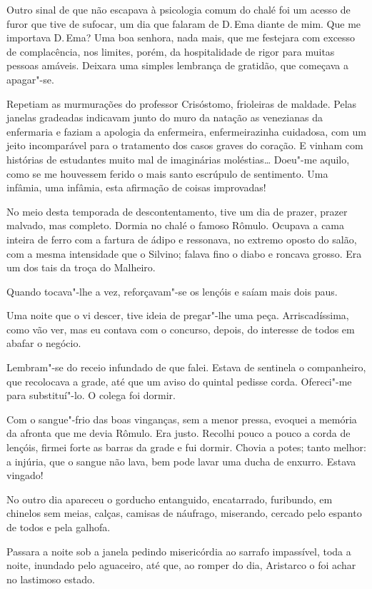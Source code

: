 Outro sinal de que
não escapava à psicologia comum do chalé foi um acesso de furor que
tive de sufocar, um dia que falaram de D.\,Ema diante de mim. Que me
importava D.\,Ema? Uma boa senhora, nada mais, que me festejara com
excesso de complacência, nos limites, porém, da hospitalidade de rigor
para muitas pessoas amáveis. Deixara uma simples lembrança de gratidão,
que começava a apagar"-se. 

Repetiam as murmurações do professor
Crisóstomo, frioleiras de maldade. Pelas janelas gradeadas indicavam
junto do muro da natação as venezianas da enfermaria e faziam a
apologia da enfermeira, enfermeirazinha cuidadosa, com um jeito
incomparável para o tratamento dos casos graves do coração. E vinham
com histórias de estudantes muito mal de imaginárias moléstias\ldots{}
Doeu"-me aquilo, como se me houvessem ferido o mais santo escrúpulo de
sentimento. Uma infâmia, uma
infâmia, esta afirmação de coisas improvadas! 

No meio desta temporada de
descontentamento, tive um dia de prazer, prazer malvado, mas completo.
Dormia no chalé o famoso Rômulo. Ocupava a cama inteira de ferro com a
fartura de ádipo e ressonava, no extremo oposto do salão, com a mesma
intensidade que o Silvino; falava fino o diabo e roncava grosso. Era um
dos tais da troça do Malheiro. 

Quando tocava"-lhe a vez,
reforçavam"-se os lençóis e saíam mais dois paus. 

Uma noite que o vi
descer, tive ideia de pregar"-lhe uma peça. Arriscadíssima, como vão
ver, mas eu contava com o concurso, depois, do interesse de todos em
abafar o negócio. 

Lembram"-se do receio infundado de que falei. Estava
de sentinela o companheiro, que recolocava a grade, até que um aviso do
quintal pedisse corda. Ofereci"-me para substituí"-lo. O colega foi
dormir. 

Com o sangue"-frio das boas vinganças, sem a menor pressa,
evoquei a memória da afronta que me devia Rômulo. Era justo. Recolhi
pouco a pouco a corda de lençóis, firmei forte as barras da grade e fui
dormir. Chovia a potes; tanto melhor: a injúria, que o sangue não lava,
bem pode lavar uma ducha de enxurro. Estava vingado! 

No outro dia
apareceu o gorducho entanguido, encatarrado, furibundo, em chinelos sem
meias, calças, camisas de náufrago, miserando, cercado pelo espanto de
todos e pela galhofa. 

Passara a noite sob a janela pedindo misericórdia
ao sarrafo impassível, toda a noite, inundado pelo aguaceiro, até que,
ao romper do dia, Aristarco o foi achar no lastimoso estado. 

